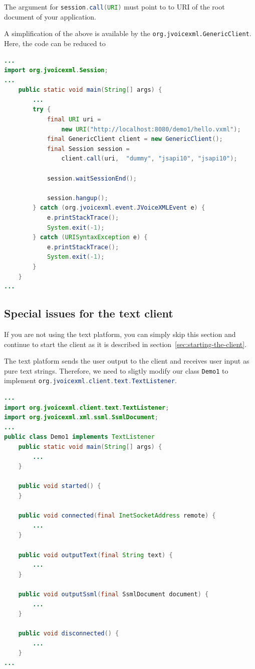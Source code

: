 \documentclass[11pt,a4paper]{book}
\begin{document}
The argument for \lstinline[language=Java]{session.call(URI)} must point to to URI of the
root document of your application.

A simplification of the above is available by the
\lstinline{org.jvoicexml.GenericClient}. Here, the code can be reduced to

\begin{lstlisting}[language=Java]
...
import org.jvoicexml.Session;
...
    public static void main(String[] args) {
        ...
        try {
            final URI uri = 
                new URI("http://localhost:8080/demo1/hello.vxml");
            final GenericClient client = new GenericClient();
            final Session session =
                client.call(uri,  "dummy", "jsapi10", "jsapi10");

            session.waitSessionEnd();

            session.hangup();
        } catch (org.jvoicexml.event.JVoiceXMLEvent e) {
            e.printStackTrace();
            System.exit(-1);
        } catch (URISyntaxException e) {
            e.printStackTrace();
            System.exit(-1);
        }
    }
...
\end{lstlisting}

\subsection{Special issues for the text client}

If you are not using the text platform, you can simply skip this section and
continue to start the client as it is described in
section~\ref{sec:starting-the-client}.

The text platform sends the user output to the client and receives user input as
pure text strings. Therefore, we need to sligtly modify our class
\lstinline[language=Java]{Demo1} to implement
\lstinline[language=Java]{org.jvoicexml.client.text.TextListener}. 

\begin{lstlisting}[language=Java]
...
import org.jvoicexml.client.text.TextListener;
import org.jvoicexml.xml.ssml.SsmlDocument;
...
public class Demo1 implements TextListener
    public static void main(String[] args) {
        ...
    }

    public void started() {
    }

    public void connected(final InetSocketAddress remote) {
        ...
    }

    public void outputText(final String text) {
        ...
    }

    public void outputSsml(final SsmlDocument document) {
        ...
    }

    public void disconnected() {
        ...
    }
...
\end{lstlisting}
\end{document}
